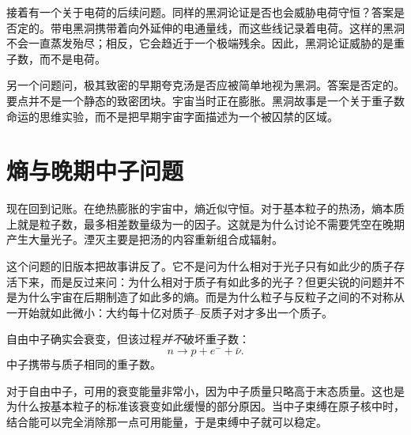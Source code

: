 接着有一个关于电荷的后续问题。同样的黑洞论证是否也会威胁电荷守恒？答案是否定的。带电黑洞携带着向外延伸的电通量线，而这些线记录着电荷。这样的黑洞不会一直蒸发殆尽；相反，它会趋近于一个极端残余。因此，黑洞论证威胁的是重子数，而不是电荷。

另一个问题问，极其致密的早期夸克汤是否应被简单地视为黑洞。答案是否定的。要点并不是一个静态的致密团块。宇宙当时正在膨胀。黑洞故事是一个关于重子数命运的思维实验，而不是把早期宇宙字面描述为一个被囚禁的区域。

\begin{classroomqa}
\end{classroomqa}

\section{熵与晚期中子问题}

现在回到记账。在绝热膨胀的宇宙中，熵近似守恒。对于基本粒子的热汤，熵本质上就是粒子数，最多相差数量级为一的因子。这就是为什么讨论不需要凭空在晚期产生大量光子。湮灭主要是把汤的内容重新组合成辐射。

这个问题的旧版本把故事讲反了。它不是问为什么相对于光子只有如此少的质子存活下来，而是反过来问：为什么相对于质子有如此多的光子？但更尖锐的问题并不是为什么宇宙在后期制造了如此多的熵。而是为什么粒子与反粒子之间的不对称从一开始就如此微小：大约每十亿对质子--反质子对才多出一个质子。

自由中子确实会衰变，但该过程\emph{并不}破坏重子数：
\[
n \to p + e^- + \bar\nu.
\]
中子携带与质子相同的重子数。

对于自由中子，可用的衰变能量非常小，因为中子质量只略高于末态质量。这也是为什么按基本粒子的标准该衰变如此缓慢的部分原因。当中子束缚在原子核中时，结合能可以完全消除那一点可用能量，于是束缚中子就可以稳定。

\begin{classroomqa}
\end{classroomqa}

